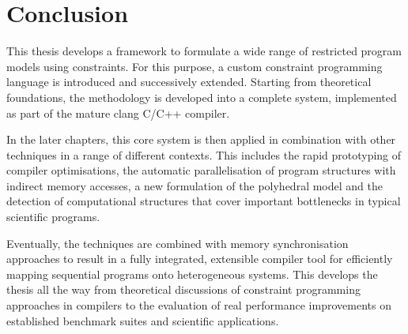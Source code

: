 \section{Conclusion}

    This thesis develops a framework to formulate a wide range of restricted
    program models using constraints.
    For this purpose, a custom constraint programming language is introduced
    and successively extended.
    Starting from theoretical foundations, the methodology is developed into
    a complete system, implemented as part of the mature clang C/C++ compiler.

    In the later chapters, this core system is then applied in combination
    with other techniques in a range of different contexts.
    This includes the rapid prototyping of compiler optimisations, the
    automatic parallelisation of program structures with indirect memory
    accesses, a new formulation of the polyhedral model and the detection of
    computational structures that cover important bottlenecks in typical
    scientific programs.
    
    Eventually, the techniques are combined with memory synchronisation
    approaches to result in a fully integrated, extensible compiler tool for
    efficiently mapping sequential programs onto heterogeneous systems.
    This develops the thesis all the way from theoretical discussions of
    constraint programming approaches in compilers to the evaluation of real
    performance improvements on established benchmark suites and scientific
    applications.









